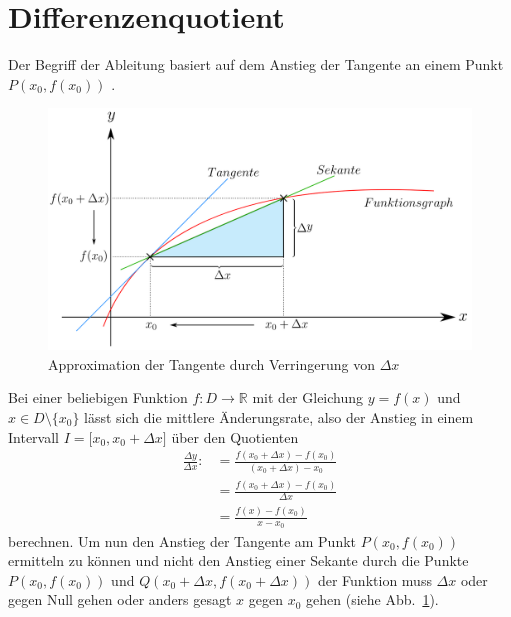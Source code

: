 \documentclass[11pt, a4paper]{report}
\begin{document}
\section{Differenzenquotient}
Der Begriff der Ableitung basiert auf dem Anstieg der Tangente  an einem Punkt $P(x_0,f(x_0))$ \cite[Seite 141]{Stewart.2015}.
\\
\begin{figure}
\centering
\includegraphics[scale=0.25]{fig/Ableitung}
\caption[Approximation der Tangente durch Verringerung von $\Delta x$]{Approximation der Tangente durch Verringerung von $\Delta x$ \cite{JohannesSchneider.2015}}
\label{fig:Ableitung}
\end{figure} 
Bei einer beliebigen Funktion $f:D \rightarrow \mathbb{R}$ mit der Gleichung $y = f(x)$ und $x \in D \setminus \lbrace x_0 \rbrace$ lässt sich die mittlere Änderungsrate, also der Anstieg in einem Intervall $I = \lbrack x_0,x_0+\Delta x \rbrack$ über den Quotienten 
\begin{align}
\frac{\Delta y}{\Delta x}:&=\frac{f(x_0+\Delta x)-f(x_0)}{(x_0+\Delta x)-x_0}\\
&= \frac{f(x_0+\Delta x)-f(x_0)}{\Delta x}\label{DefDifferenzenquo}\\
&= \frac{f(x)-f(x_0)}{x-x_0}
\end{align}
berechnen.
\clearpage
Um nun den Anstieg der Tangente am Punkt $P(x_0,f(x_0))$ ermitteln zu können und nicht den Anstieg einer Sekante durch die Punkte $P(x_0,f(x_0))$ und $Q(x_0+\Delta x,f(x_0+\Delta x))$ der Funktion muss $\Delta x$ oder gegen Null gehen oder anders gesagt $x$ gegen $x_0$ gehen (siehe Abb.~\ref{fig:Ableitung}). 
\end{document}
